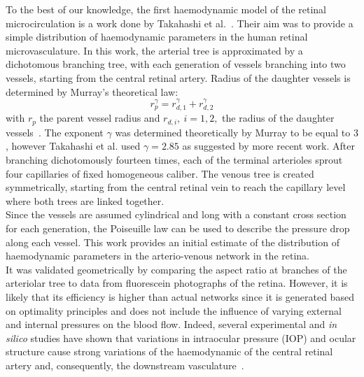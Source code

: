 \documentclass[12pt,a4paper]{article}
\begin{document}
To the best of our knowledge, the first haemodynamic model of the retinal microcirculation is a work done by Takahashi et al.~\cite{Takahashi_2009}.
Their aim was to provide a simple distribution of haemodynamic parameters in the human retinal microvasculature.
In this work, the arterial tree is approximated by a dichotomous branching tree, with each generation of vessels branching into two vessels, starting from the central retinal artery.
Radius of the daughter vessels is determined by Murray's theoretical law:
\begin{equation}
  \label{eq:MurrayLaw}
  r_p^\gamma = r_{d,1}^\gamma + r_{d,2}^\gamma
\end{equation}
with $r_p$ the parent vessel radius and $r_{d,i},~i=1,2,$ the radius of the daughter vessels~\cite{Murray_1926}.
The exponent $\gamma$ was determined theoretically by Murray to be equal to $3$, however Takahashi et al. used $\gamma=2.85$ as suggested by more recent work.
After branching dichotomously fourteen times, each of the terminal arterioles sprout four capillaries of fixed homogeneous caliber. 
The venous tree is created symmetrically, starting from the central retinal vein to reach the capillary level where both trees are linked together.\\
Since the vessels are assumed cylindrical and long with a constant cross section for each generation, the Poiseuille law can be used to describe the pressure drop along each vessel.
This work provides an initial estimate of the distribution of haemodynamic parameters in the arterio-venous network in the retina. \\
It was validated geometrically by comparing the aspect ratio at branches of the arteriolar tree to data from fluorescein photographs of the retina. 
However, it is likely that its efficiency is higher than actual networks since it is generated based on optimality principles and does not include the influence of varying external and internal pressures on the blood flow.
Indeed, several experimental and \textit{in silico} studies have shown that variations in intraocular pressure (IOP) and ocular structure cause strong variations of the haemodynamic of the central retinal artery and, consequently, the downstream vasculature~\cite{Guidoboni_2014, Harris_1996}.
\end{document}
